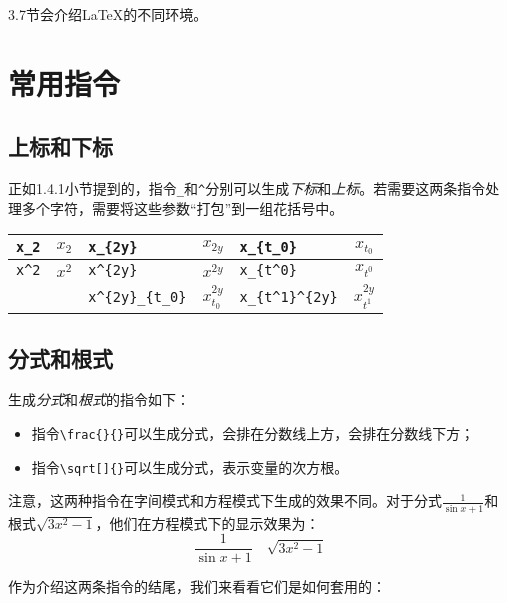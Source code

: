 3.7节会介绍\LaTeX 的不同环境。

\section{常用指令}

\subsection{上标和下标}

正如1.4.1小节提到的，指令\verb|_|和\verb|^|分别可以生成\emph{下标}和\emph{上标}。若需要这两条指令处理多个字符，需要将这些参数``打包''到一组花括号中。

\begin{center}
  \begin{tabular}{lc|lc|lc}
    \verb|x_2| & $x_2$ & \verb|x_{2y}| & $x_{2y}$ & \verb|x_{t_0}| & $x_{t_0}$ \\
    \hline
    \verb|x^2| & $x^2$ & \verb|x^{2y}| & $x^{2y}$ & \verb|x_{t^0}| & $x_{t^0}$ \\
    \hline
    & &  \verb|x^{2y}_{t_0}| & $x^{2y}_{t_0}$ & \verb|x_{t^1}^{2y}| & $x_{t^1}^{2y}$
  \end{tabular}
\end{center}

\subsection{分式和根式}

生成\emph{分式}和\emph{根式}的指令如下：

\begin{itemize}
  \item 指令\verb|\frac{|\verb|}{|\verb|}|可以生成分式，会排在分数线上方，会排在分数线下方；
  \item 指令\verb|\sqrt[|\verb|]{|\verb|}|可以生成分式，表示变量的次方根。
\end{itemize}

注意，这两种指令在字间模式和方程模式下生成的效果不同。对于分式$\frac{1}{\sin x + 1}$和根式$\sqrt{3x^2-1}$，他们在方程模式下的显示效果为：
\begin{displaymath}
  \frac{1}{\sin x + 1}\quad \sqrt{3x^2-1}
\end{displaymath}

作为介绍这两条指令的结尾，我们来看看它们是如何套用的：

